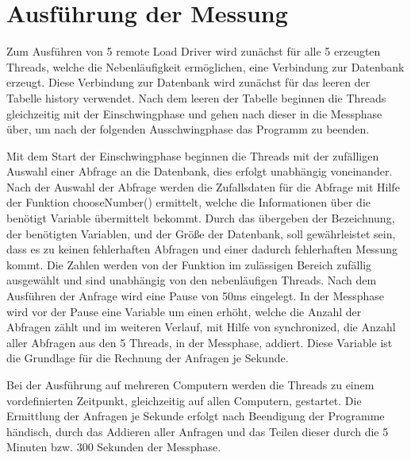 \section{Ausführung der Messung}

Zum Ausführen von 5 remote Load Driver wird zunächst für alle 5 erzeugten
Threads, welche die Nebenläufigkeit ermöglichen, eine Verbindung zur Datenbank
erzeugt. Diese Verbindung zur Datenbank wird zunächst für das leeren der
Tabelle history verwendet. Nach dem leeren der Tabelle beginnen die Threads
gleichzeitig mit der Einschwingphase und gehen nach dieser in die Messphase
über, um nach der folgenden Ausschwingphase das Programm zu beenden.

Mit dem Start der Einschwingphase beginnen die Threads mit der zufälligen
Auswahl einer Abfrage an die Datenbank, dies erfolgt unabhängig voneinander.
Nach der Auswahl der Abfrage werden die Zufallsdaten für die Abfrage mit Hilfe
der Funktion chooseNumber() ermittelt, welche die Informationen über die
benötigt Variable übermittelt bekommt. Durch das übergeben der Bezeichnung, der
benötigten Variablen, und der Größe der Datenbank, soll gewährleistet sein,
dass es zu keinen fehlerhaften Abfragen und einer dadurch fehlerhaften Messung
kommt. Die Zahlen werden von der Funktion im zulässigen Bereich zufällig
ausgewählt und sind unabhängig von den nebenläufigen Threads. Nach dem
Ausführen der Anfrage wird eine Pause von 50ms eingelegt. In der Messphase wird
vor der Pause eine Variable um einen erhöht, welche die Anzahl der Abfragen
zählt und im weiteren Verlauf, mit Hilfe von synchronized, die Anzahl aller
Abfragen aus den 5 Threads, in der Messphase, addiert. Diese Variable ist die
Grundlage für die Rechnung der Anfragen je Sekunde.

Bei der Ausführung auf mehreren Computern werden die Threads zu einem
vordefinierten Zeitpunkt,  gleichzeitig auf allen Computern, gestartet. Die
Ermittlung der Anfragen je Sekunde erfolgt nach Beendigung der Programme
händisch, durch das Addieren aller Anfragen und das Teilen dieser durch die 5
Minuten bzw. 300 Sekunden der Messphase.

\clearpage